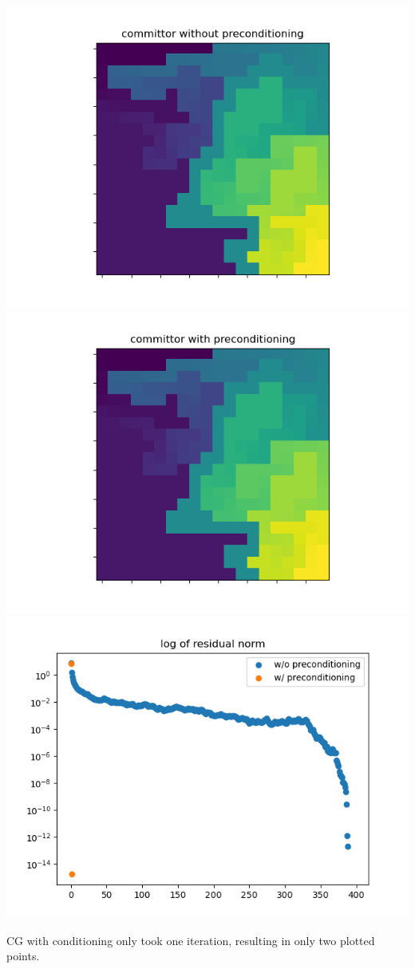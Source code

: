 \documentclass{article}
\begin{document}
\begin{enumerate}
	\begin{center}
		\includegraphics[scale=.4]{committor without preconditioning}
		\includegraphics[scale=.4]{committor with preconditioning}
		\includegraphics[scale=.5]{residual norm}
	\end{center}
	CG with conditioning only took one iteration, resulting in only two plotted points.
	
	
\end{enumerate}
	
	
	
	
\end{document}
